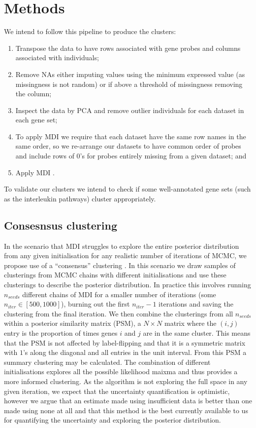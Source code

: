 \documentclass[12pt]{article} %
\begin{document}
	\section{Methods}
	We intend to follow this pipeline to produce the clusters:
	\begin{enumerate} \label{list:methods}
		\item Transpose the data to have rows associated with gene probes and columns associated with individuals;
		\item Remove NAs either imputing values using the minimum expressed value (as missingness is not random) or if above a threshold of missingness removing the column;
		\item Inspect the data by PCA and remove outlier individuals for each dataset in each gene set;
		\item To apply MDI we require that each dataset have the same row names in the same order, so we re-arrange our datasets to have common order of probes and include rows of 0’s for probes entirely missing from a given dataset; and
		\item Apply MDI \cite{MasonMDIGPUacceleratingintegrative2016a}.
	\end{enumerate}
	To validate our clusters we intend to check if some well-annotated gene sets (such as the interleukin pathways) cluster appropriately.
	
	\subsection{Consesnsus clustering}
	In the scenario that MDI struggles to explore the entire posterior distribution from any given initialisation for any realistic number of iterations of MCMC, we propose use of a ``consensus'' clustering \cite{MontiConsensusClusteringResamplingBased}. In this scenario we draw samples of clusterings from MCMC chains with different initialisations and use these clusterings to describe the posterior distribution. In practice this involves running $n_{seeds}$ different chains of MDI for a smaller number of iterations (some $n_{iter} \in [500, 1000]$), burning out the first $n_{iter} - 1$ iterations and saving the clustering from the final iteration. We then combine the clusterings from all $n_{seeds}$ within a posterior similarity matrix (PSM), a $N \times N$ matrix where the $(i,j)$ entry is the proportion of times genes $i$ and $j$ are in the same cluster. This means that the PSM is not affected by label-flipping and that it is a symmetric matrix with $1$'s along the diagonal and all entries in the unit interval. From this PSM a summary clustering may be calculated. The combination of different initialisations explores all the possible likelihood maixma and thus provides a more informed clustering. As the algorithm is not exploring the full space in any given iteration, we expect that the uncertainty quantification is optimistic, however we argue that an estimate made using insufficient data is better than one made using none at all and that this method is the best currently available to us for quantifying the uncertainty and exploring the posterior distribution.
\end{document}

